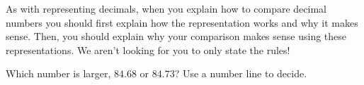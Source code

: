 \documentclass{ximera}
\begin{document}
As with representing decimals, when you explain how to compare decimal numbers you should first explain how the representation works and why it makes sense. Then, you should explain why your comparison makes sense using these representations. We aren't looking for you to only state the rules!

\begin{question}
Which number is larger, $84.68$ or $84.73$? Use a number line to decide.

\begin{multipleChoice}
\end{multipleChoice}
\end{question}
\end{document}
